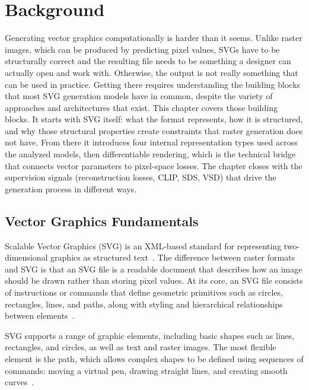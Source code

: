 \chapter{Background}\label{ch:Background}

Generating vector graphics computationally is harder than 
it seems. Unlike raster images, which can be produced by 
predicting pixel values, SVGs have to be 
structurally correct and the resulting file needs 
to be something a designer can actually open and work with. Otherwise,
the output is not really something that can be used in practice.   
Getting there requires understanding the building 
blocks that most SVG generation models have in common, 
despite the variety of approaches and architectures that exist. 
This chapter covers those building blocks. It starts with 
SVG itself: what the format represents, how it is structured, 
and why those structural properties create constraints that 
raster generation does not have. From there it introduces 
four internal representation types used across the analyzed 
models, then differentiable rendering, which is the technical 
bridge that connects vector parameters to pixel-space losses. 
The chapter closes with the supervision signals (reconstruction 
losses, CLIP, SDS, VSD) that drive the generation process in 
different ways.

\section{Vector Graphics Fundamentals}
\label{sec:vector_fundamentals}

Scalable Vector Graphics (SVG) is an XML-based standard for 
representing two-dimensional graphics as structured 
text~\cite{eisenbergSVGEssentialsProducing20}. The difference between raster formats and SVG 
is that an SVG file is a readable document that describes how an image should 
be drawn rather than storing pixel values. At its core, an SVG file consists of instructions or commands that 
define geometric primitives such as circles, rectangles, lines, and 
paths, along with styling and hierarchical relationships between 
elements~\cite{quintScalableVectorGraphics2003}.

SVG supports a range of graphic elements, including basic shapes 
such as lines, rectangles, and circles, as well as text and 
raster images. The most flexible element is the path, 
which allows complex shapes to be defined using sequences of 
commands: moving a virtual pen, drawing straight lines, and 
creating smooth curves~\cite{eisenbergSVGEssentialsProducing20}.


